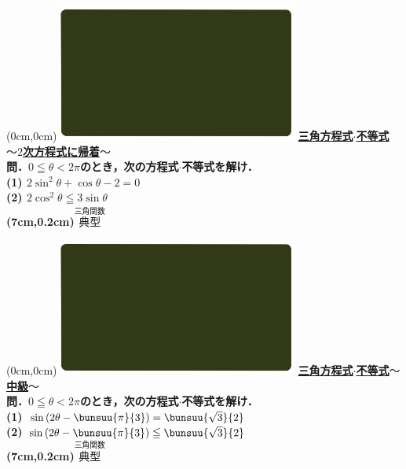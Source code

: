 \documentclass[10pt,
fleqn,
dvipdfmx,
uplatex
]{jsarticle}
\begin{document}
\at(0cm,0cm){\includegraphics[width=8cm,bb=0 0 1920 1080]{./media_local/smart_background/三角関数.jpeg}}
{\color{orange}\bf\boldmath\normalsize\underline{三角方程式$\cdot$不等式$〜2$次方程式に帰着$〜$}}\vspace{0.3zw}\\
\Large 
\bf\boldmath 問．$0\leqq \theta <2\pi$のとき，次の方程式$\cdot$不等式を解け．\\
(1)  $2\sin ^2\theta +\cos \theta -2=0$\\
(2)  $2\cos ^2\theta \leqq 3\sin \theta$\\

\at(7cm,0.2cm){\small\color{bradorange}$\overset{\text{三角関数}}{\text{典型}}$}


\newpage



\at(0cm,0cm){\includegraphics[width=8cm,bb=0 0 1920 1080]{./media_local/smart_background/三角関数.jpeg}}
{\color{orange}\bf\boldmath\Large\underline{三角方程式$\cdot$不等式$〜$中級$〜$}}\vspace{0.3zw}\\
\large 
\bf\boldmath 問．$0\leqq \theta <2\pi$のとき，次の方程式$\cdot$不等式を解け．\\
(1)  $\sin \left(2\theta -\bunsuu{\pi }{3}\right)=\bunsuu{{\sqrt 3}}{2}$\\
(2)  $\sin \left(2\theta -\bunsuu{\pi }{3}\right)\leqq \bunsuu{{\sqrt 3}}{2}$\\

\at(7cm,0.2cm){\small\color{bradorange}$\overset{\text{三角関数}}{\text{典型}}$}


\newpage
\end{document}
